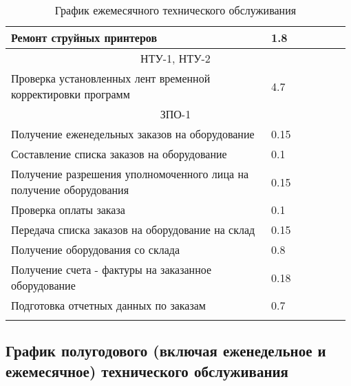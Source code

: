 \documentclass[a4paper,14pt]{extarticle}
\begin{document}
\begin{longtable}{|p{0.75\linewidth}|m{0.23\linewidth}|}
		Ремонт струйных принтеров  & 1.8 \\ \hline
		\multicolumn{ 2}{|c|}{НТУ-1, НТУ-2} \\ \hline
		Проверка установленных лент временной корректировки программ  & 4.7 \\ \hline
		\multicolumn{ 2}{|c|}{ЗПО-1} \\ \hline
		Получение еженедельных заказов на оборудование  & 0.15 \\ \hline
		Составление списка заказов на оборудование  & 0.1 \\ \hline
		Получение разрешения уполномоченного лица на получение оборудования  & 0.15 \\ \hline
		Проверка оплаты заказа  & 0.1 \\ \hline
		Передача списка заказов на оборудование на склад  & 0.15 \\ \hline
		Получение оборудования со склада  & 0.8 \\ \hline
		Получение счета - фактуры на заказанное оборудование  & 0.18 \\ \hline
		Подготовка отчетных данных по заказам  & 0.7 \\ \hline
		\caption{График ежемесячного технического обслуживания}
		\label{tab:month}
	\end{longtable}


\subsection*{График полугодового (включая еженедельное и ежемесячное) технического обслуживания}
\end{document}
